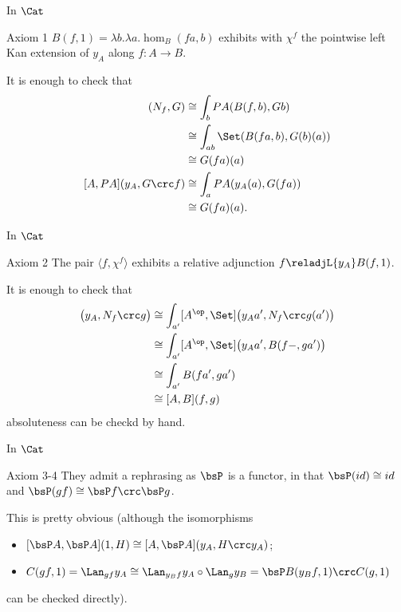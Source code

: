 \documentclass{beamer}
\begin{document}
\begin{frame}{In $\Cat$}
	\begin{block}{Axiom 1}
		$B(f,1) = \lambda b.\lambda a.\hom_B(fa,b)$ exhibits with $\chi^f$ the pointwise left Kan extension of $y_A$ along $f : A \to B$.
	\end{block}
	\pause
	It is enough to check that
	\begin{align*}
		[B,PA](N_f,G)       & \cong \int_b PA(B(f,b),Gb)             \\
		                    & \cong \int_{ab} \Set(B(fa,b), G(b)(a)) \\
		                    & \cong G(fa)(a)                         \\
		[A,PA](y_A,G\crc f) & \cong \int_a PA(y_A(a), G(fa))         \\
		                    & \cong G(fa)(a).
	\end{align*}
\end{frame}
\begin{frame}{In $\Cat$}
	\begin{block}{Axiom 2}
		The pair $\langle f, \chi^f\rangle$ exhibits a relative adjunction $f\reladjL{y_A} B(f,1)$.
	\end{block}
	\pause
	It is enough to check that
	\begin{align*}
		[A,PA]\big( y_A, N_f\crc g \big) & \cong \int_{a'}[A^\op,\Set]\big(y_A{a'}, N_f\crc g(a')\big) \\
		                                 & \cong \int_{a'}[A^\op,\Set]\big( y_A{a'}, B(f - ,ga')\big)  \\
		                                 & \cong \int_{a'}B(fa',ga')                                   \\ &\cong [A,B](f,g)
	\end{align*}
	absoluteness can be checkd by hand.
\end{frame}
\begin{frame}{In $\Cat$}
	\begin{block}{Axiom 3-4}
		They admit a rephrasing as $\bsP$ is a functor, in that $\bsP(id)\cong id$ and $\bsP(gf)\cong \bsP f\crc\bsP g$.
	\end{block}
	\pause
	\bigskip
	This is pretty obvious (although the isomorphisms
	\medskip
	\begin{itemize}
		\item[3)] $[\bsP A,\bsP A](1, H)\cong [A,\bsP A](y_A,H\crc y_A)$;
		\item[4)] $C(gf,1)=\Lan_{gf}y_A \cong \Lan_{y_B f}y_A \circ \Lan_g y_B = \bsP B(y_Bf,1)\crc C(g,1)$
	\end{itemize}
	\medskip
	can be checked directly).
\end{frame}
\end{document}
